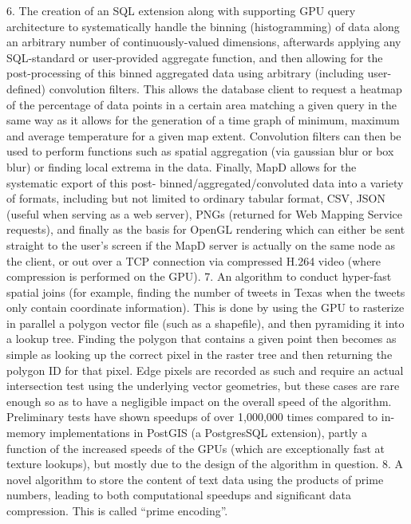\documentclass[twocolumn]{article}
\begin{document}
6. The creation of an SQL extension along with supporting GPU query architecture to systematically handle the binning (histogramming) of data along an arbitrary number of continuously-valued dimensions, afterwards applying any SQL-standard or user-provided aggregate function, and then allowing for the post-processing of this binned aggregated data
using arbitrary (including user-defined) convolution filters. This allows the database client to request a heatmap of the percentage of data points in a certain area matching a given query in the same way as it allows for the generation of a time graph of minimum, maximum and average temperature for a given map extent. Convolution filters can then be used to perform functions such as spatial aggregation (via gaussian blur or box blur) or finding local extrema in the data. Finally, MapD allows for the systematic export of this post- binned/aggregated/convoluted data into a variety of formats, including but not limited to ordinary tabular format, CSV, JSON (useful when serving as a web server), PNGs (returned for Web Mapping Service requests), and finally as the basis for OpenGL rendering which can either be sent straight to the user’s screen if the MapD server is actually on the same node as the client, or out over a TCP connection via compressed H.264 video (where compression is performed on the GPU).
7. An algorithm to conduct hyper-fast spatial joins (for example, finding the number of tweets in Texas when the tweets only contain coordinate information). This is done by using the GPU to rasterize in parallel a polygon vector file (such as a shapefile), and then pyramiding it into a lookup tree. Finding the polygon that contains a given point then becomes as simple as looking up the correct pixel in the raster tree and then returning the polygon ID for that pixel. Edge pixels are recorded as such and require an actual intersection test using the underlying vector geometries, but these cases are rare enough so as to have a negligible impact on the overall speed of the algorithm. Preliminary tests have shown speedups of over 1,000,000 times compared to in-memory implementations in PostGIS (a PostgresSQL extension), partly a function of the increased speeds of the GPUs (which are exceptionally fast at texture lookups), but mostly due to the design of the algorithm in question.
8. A novel algorithm to store the content of text data using the products of prime numbers, leading to both computational speedups and significant data compression. This is called “prime encoding”.
\end{document}

